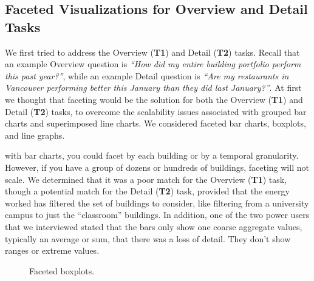 \documentclass[journal]{vgtc}                %
\newcommand{\bstart}[1]{\vspace{1mm} \noindent{\textbf{#1:}}}
\begin{document}

\subsection{Faceted Visualizations for Overview and Detail Tasks}
\label{design-faceting}



We first tried to address the Overview ({\bf T1}) and Detail ({\bf T2}) tasks. 
Recall that an example Overview question is {\it ``How did my entire building portfolio perform this past year?''}, while an example Detail question is {\it ``Are my restaurants in Vancouver performing better this January than they did last January?''}.
At first we thought that faceting would be the solution for both the Overview ({\bf T1}) and Detail ({\bf T2}) tasks, to overcome the scalability issues associated with grouped bar charts and superimposed line charts.
We considered faceted bar charts, boxplots, and line graphs.

\bstart{Faceted bar charts} with bar charts, you could facet by each building or by a temporal granularity. 
However, if you have a group of dozens or hundreds of buildings, faceting will not scale. 
We determined that it was a poor match for the Overview ({\bf T1}) task, though a potential match for the Detail ({\bf T2}) task, provided that the energy worked has filtered the set of buildings to consider, like filtering from a university campus to just the ``classroom'' buildings.
In addition, one of the two power users that we interviewed stated that the bars only show one coarse aggregate values, typically an average or sum, that there was a loss of detail. 
They don't show ranges or extreme values.

\begin{figure}[ht]
	\centering
	\vspace{-0.3cm}
	\caption{Faceted boxplots.}
	\label{fig:sandbox-faceted-boxplot}
	\vspace{-0.3cm}
\end{figure} 
\end{document}

